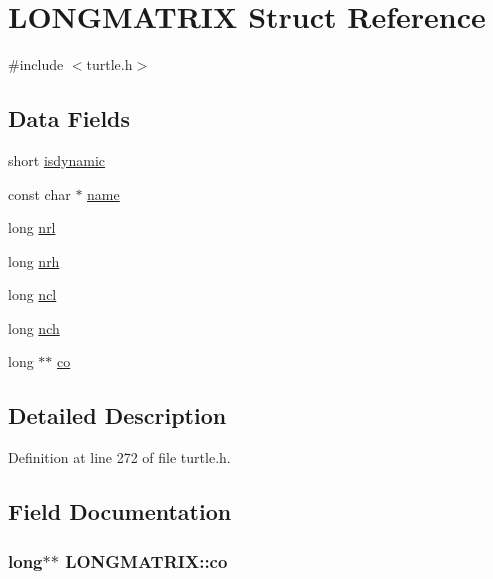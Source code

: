 \hypertarget{struct_l_o_n_g_m_a_t_r_i_x}{\section{L\-O\-N\-G\-M\-A\-T\-R\-I\-X Struct Reference}
\label{struct_l_o_n_g_m_a_t_r_i_x}
}


{\ttfamily \#include $<$turtle.\-h$>$}

\subsection*{Data Fields}
\begin{DoxyCompactItemize}
\item 
short \hyperlink{struct_l_o_n_g_m_a_t_r_i_x_a576a302b56ba47e39c4c2748166195ed}{isdynamic}
\item 
const char $\ast$ \hyperlink{struct_l_o_n_g_m_a_t_r_i_x_a47b74cf4fed725ea020e245a9cee38bd}{name}
\item 
long \hyperlink{struct_l_o_n_g_m_a_t_r_i_x_ab31fdd3a6a40f30a2c6fc9abf045e6f9}{nrl}
\item 
long \hyperlink{struct_l_o_n_g_m_a_t_r_i_x_a3e9b599ce3ff8e5359788c76c7d014f1}{nrh}
\item 
long \hyperlink{struct_l_o_n_g_m_a_t_r_i_x_aaf64ac07b9a44811dd7f0e4ce148c79d}{ncl}
\item 
long \hyperlink{struct_l_o_n_g_m_a_t_r_i_x_a49cdf4afd4a1cc0fa12f54e714de892b}{nch}
\item 
long $\ast$$\ast$ \hyperlink{struct_l_o_n_g_m_a_t_r_i_x_aec381813483856408080d721945b58c8}{co}
\end{DoxyCompactItemize}


\subsection{Detailed Description}


Definition at line 272 of file turtle.\-h.



\subsection{Field Documentation}
\hypertarget{struct_l_o_n_g_m_a_t_r_i_x_aec381813483856408080d721945b58c8}{
\subsubsection[{co}]{\setlength{\rightskip}{0pt plus 5cm}long$\ast$$\ast$ L\-O\-N\-G\-M\-A\-T\-R\-I\-X\-::co}}\label{struct_l_o_n_g_m_a_t_r_i_x_aec381813483856408080d721945b58c8}


